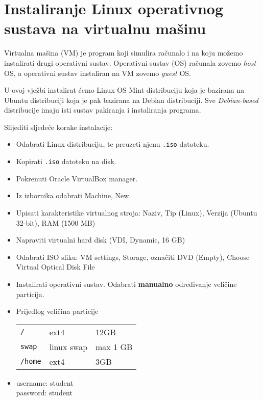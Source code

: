 

\section{Instaliranje Linux operativnog sustava na virtualnu mašinu}
Virtualna mašina (VM) je program koji simulira računalo i na koju možemo instalirati drugi operativni sustav. Operativni sustav (OS) računala zovemo \textit{host} OS, a operativni sustav instaliran na VM zovemo \textit{guest} OS.

U ovoj vježbi instalirat ćemo Linux OS Mint distribuciju koja je bazirana na Ubuntu distribuciji koja je pak bazirana na Debian distribuciji. Sve \textit{Debian-based} distribucije imaju isti sustav pakiranja i instaliranja programa.

\begin{zadatak} Slijediti sljedeće korake instalacije:
\begin{itemize}
\item Odabrati Linux distribuciju, te preuzeti njenu \texttt{.iso} datoteku.
\item Kopirati \texttt{.iso} datoteku na disk.
\item  Pokrenuti Oracle VirtualBox manager.
\item Iz izbornika odabrati Machine, New.
\item Upisati karakteristike virtualnog stroja: Naziv, Tip (Linux), Verzija (Ubuntu 32-bit), RAM (1500 MB)
\item Napraviti virtualni hard disk (VDI, Dynamic, 16 GB)
\item Odabrati ISO sliku: VM settings, Storage, označiti DVD (Empty), Choose Virtual Optical Disk File
\item Instalirati operativni sustav. Odabrati \textbf{manualno} određivanje veličine particija.
    
\item Prijedlog veličina particije 

\begin{tabular}{lll}
 \texttt{/} & ext4 & 12GB \\
 \texttt{swap} & linux swap & max 1 GB\\
 \texttt{/home} & ext4 & 3GB 
 \end{tabular}
\item username: student\\
      password: student
\end{itemize}
\end{zadatak}
 

